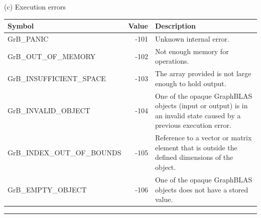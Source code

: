 \begin{table}[bh]
\begin{center}
\vspace{1\baselineskip}
(c) Execution errors
\vspace{1\baselineskip}

\begin{tabular}{l|r|p{3.4in}}
Symbol    & Value & Description \\ \hline
{\sf GrB\_PANIC}                  & -101 & Unknown internal error. \\
{\sf GrB\_OUT\_OF\_MEMORY}        & -102 & Not enough memory for operations. \\
{\sf GrB\_INSUFFICIENT\_SPACE}    & -103 & The array provided is not large enough to hold output. \\
{\sf GrB\_INVALID\_OBJECT}        & -104 & One of the opaque GraphBLAS objects (input or output) is in an invalid state caused by a previous execution error. \\
{\sf GrB\_INDEX\_OUT\_OF\_BOUNDS} & -105 & Reference to a vector or matrix element that is outside the defined dimensions of the object. \\
{\sf GrB\_EMPTY\_OBJECT}          & -106 & One of the opaque GraphBLAS objects does not have a stored value. \\
\end{tabular}

\end{center}
\hrule
\end{table}

